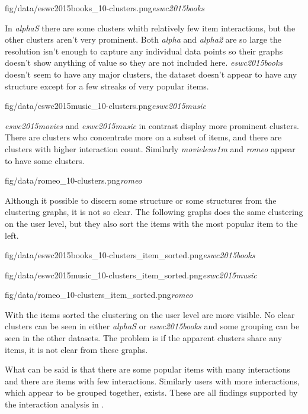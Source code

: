 \FloatBarrier

{fig/data/eswc2015books_10-clusters.png}{\textit{eswc2015books}}

\FloatBarrier

In \textit{alphaS} there are some clusters whith relatively few item interactions, but the other clusters aren't very prominent. Both \textit{alpha} and \textit{alpha2} are so large the resolution isn't enough to capture any individual data points so their graphs doesn't show anything of value so they are not included here.
\textit{eswc2015books} doesn't seem to have any major clusters, the dataset doesn't appear to have any structure except for a few streaks of very popular items.

{fig/data/eswc2015music_10-clusters.png}{\textit{eswc2015music}}

\textit{eswc2015movies} and \textit{eswc2015music} in contrast display more prominent clusters. There are clusters who concentrate more on a subset of items, and there are clusters with higher interaction count.  Similarly \textit{movielens1m} and \textit{romeo} appear to have some clusters.

{fig/data/romeo_10-clusters.png}{\textit{romeo}}

\FloatBarrier

Although it possible to discern some structure or some structures from the clustering graphs, it is not so clear. The following graphs does the same clustering on the user level, but they also sort the items with the most popular item to the left.

\FloatBarrier

{fig/data/eswc2015books_10-clusters_item_sorted.png}{\textit{eswc2015books}}

{fig/data/eswc2015music_10-clusters_item_sorted.png}{\textit{eswc2015music}}

{fig/data/romeo_10-clusters_item_sorted.png}{\textit{romeo}}

\FloatBarrier

With the items sorted the clustering on the user level are more visible. No clear clusters can be seen in either \textit{alphaS} or \textit{eswc2015books} and some grouping can be seen in the other datasets. The problem is if the apparent clusters share any items, it is not clear from these graphs.

What can be said is that there are some popular items with many interactions and there are items with few interactions. Similarly users with more interactions, which appear to be grouped together, exists. These are all findings supported by the interaction analysis in .

